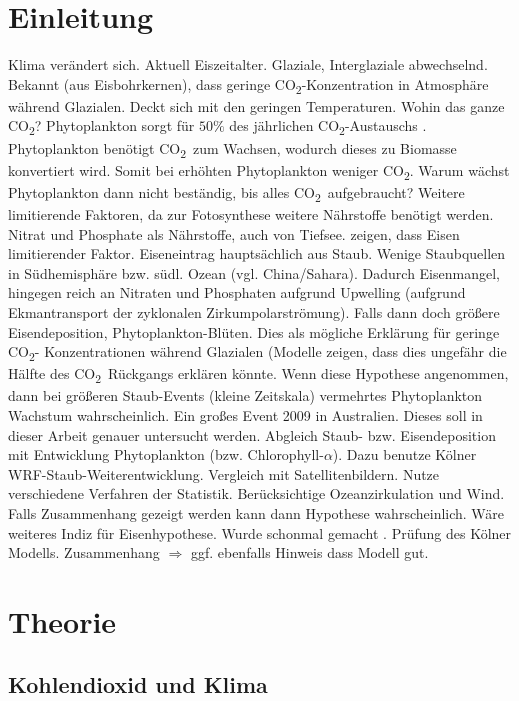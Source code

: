 \documentclass[12pt,a4paper,onecolumn]{scrartcl}
\newcommand{\cotwo}{CO\textsubscript{2}}
\begin{document}
\section{Einleitung}
Klima verändert sich. Aktuell Eiszeitalter. Glaziale, Interglaziale abwechselnd. Bekannt (aus Eisbohrkernen), dass geringe \cotwo -Konzentration in Atmosphäre während Glazialen. Deckt sich mit den geringen Temperaturen. Wohin das ganze \cotwo ? Phytoplankton sorgt für $50\%$ des jährlichen \cotwo -Austauschs \citep{Shao.2011}. Phytoplankton benötigt \cotwo \ zum Wachsen, wodurch dieses zu Biomasse konvertiert wird. Somit bei erhöhten Phytoplankton weniger \cotwo . Warum wächst Phytoplankton dann nicht beständig, bis alles \cotwo\ aufgebraucht? Weitere limitierende Faktoren, da zur Fotosynthese weitere Nährstoffe benötigt werden. Nitrat und Phosphate als Nährstoffe, auch von Tiefsee. \citet{Martin.1988} zeigen, dass Eisen limitierender Faktor. Eiseneintrag hauptsächlich aus Staub. Wenige Staubquellen in Südhemisphäre bzw. südl. Ozean (vgl. China/Sahara). Dadurch Eisenmangel, hingegen reich an Nitraten und Phosphaten aufgrund Upwelling (aufgrund Ekmantransport der zyklonalen Zirkumpolarströmung). Falls dann doch größere Eisendeposition, Phytoplankton-Blüten. Dies als mögliche Erklärung für geringe \cotwo - Konzentrationen während Glazialen (Modelle zeigen, dass dies ungefähr die Hälfte des \cotwo \ Rückgangs erklären könnte. Wenn diese Hypothese angenommen, dann bei größeren Staub-Events (kleine Zeitskala) vermehrtes Phytoplankton Wachstum wahrscheinlich. Ein großes Event 2009 in Australien. Dieses soll in dieser Arbeit genauer untersucht werden. Abgleich Staub- bzw. Eisendeposition mit Entwicklung Phytoplankton (bzw. Chlorophyll-$\alpha$). Dazu benutze Kölner WRF-Staub-Weiterentwicklung. Vergleich mit Satellitenbildern. Nutze verschiedene Verfahren der Statistik. Berücksichtige Ozeanzirkulation und Wind. Falls Zusammenhang gezeigt werden kann dann Hypothese wahrscheinlich. Wäre weiteres Indiz für Eisenhypothese. Wurde schonmal gemacht \citep{Gabric.2016}. Prüfung des Kölner Modells. Zusammenhang $\Rightarrow$ ggf. ebenfalls Hinweis dass Modell gut.

\section{Theorie}
\subsection{Kohlendioxid und Klima}
\end{document}
